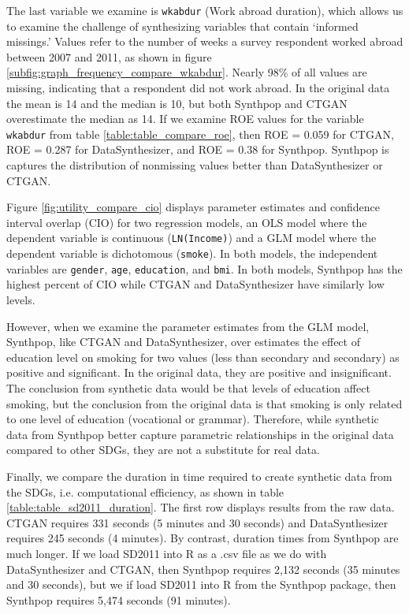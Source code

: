 \documentclass[runningheads]{llncs}
\begin{document}
The last variable we examine is \texttt{wkabdur} (Work abroad duration), which allows us to examine the challenge of synthesizing variables that contain `informed missings.'  Values refer to the number of weeks a survey respondent worked abroad between 2007 and 2011, as shown in figure \ref{subfig:graph_frequency_compare_wkabdur}.  Nearly 98\% of all values are missing, indicating that a respondent did not work abroad.  In the original data the mean is 14 and the median is 10, but both Synthpop and CTGAN overestimate the median as 14.  If we examine ROE values for the variable  \texttt{wkabdur} from table \ref{table:table_compare_roe}, then ROE = 0.059 for CTGAN, ROE = 0.287 for DataSynthesizer, and ROE = 0.38 for Synthpop.  Synthpop is captures the distribution of nonmissing values better than DataSynthesizer or CTGAN.

Figure \ref{fig:utility_compare_cio} displays parameter estimates and confidence interval overlap (CIO) for two regression models, an OLS model where the dependent variable is continuous (\texttt{LN(Income)}) and a GLM model where the dependent variable is dichotomous (\texttt{smoke}).  In both models, the independent variables are \texttt{gender}, \texttt{age}, \texttt{education}, and \texttt{bmi}.  In both models, Synthpop has the highest percent of CIO while CTGAN and DataSynthesizer have similarly low levels.  

However, when we examine the parameter estimates from the GLM model, Synthpop, like CTGAN and DataSynthesizer, over estimates the effect of education level on smoking for two values (less than secondary and secondary) as positive and significant.  In the original data, they are positive and insignificant.  The conclusion from synthetic data would be that levels of education affect smoking, but the conclusion from  the original data is that smoking is only related to one level of education (vocational or grammar).  Therefore, while synthetic data from Synthpop better capture parametric relationships in the original data compared to other SDGs, they are not a substitute for real data.

Finally, we compare the duration in time required to create synthetic data from the SDGs, i.e. computational efficiency, as shown in table \ref{table:table_sd2011_duration}.  The first row displays results from the raw data.  CTGAN requires 331 seconds (5 minutes and 30 seconds) and DataSynthesizer requires 245 seconds (4 minutes).  By contrast, duration times from Synthpop are much longer.  If we load SD2011 into \textsf{R} as a .csv file as we do with DataSynthesizer and CTGAN, then Synthpop requires 2,132 seconds (35 minutes and 30 seconds), but we if load SD2011 into \textsf{R} from the Synthpop package, then Synthpop requires 5,474 seconds (91 minutes).
\end{document}
